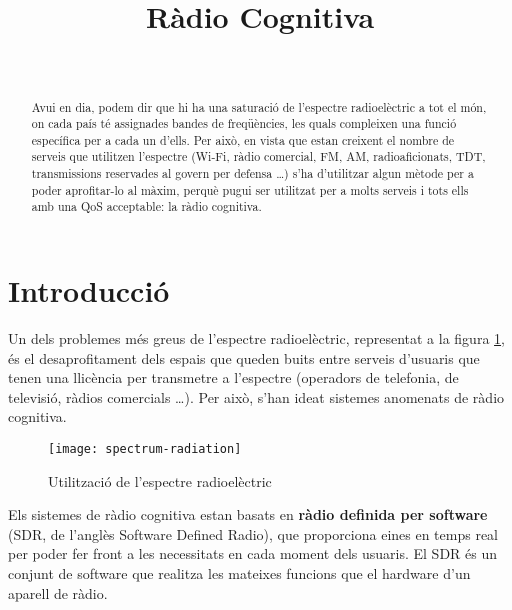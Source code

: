 \documentclass[10pt,journal,a4paper]{IEEEtran}
\begin{document}
\title{Ràdio Cognitiva}

\author{
\\
}

\maketitle

\begin{abstract}
Avui en dia, podem dir que hi ha una saturació de l’espectre radioelèctric a
tot el món, on cada país té assignades bandes de freqüències, les quals compleixen una funció específica per a cada un d’ells. Per això, en vista que estan creixent
el nombre de serveis que utilitzen l’espectre (Wi-Fi, ràdio comercial, FM,
AM, radioaficionats, TDT, transmissions reservades al govern per defensa \ldots )
s’ha d’utilitzar algun mètode per a poder aprofitar-lo al màxim, perquè pugui ser
utilitzat per a molts serveis i tots ells amb una QoS acceptable: la ràdio cognitiva.
\end{abstract}

%
%

\section{Introducció}
Un dels problemes més greus de l'espectre radioelèctric, representat a la figura \ref{logotipo}, és el desaprofitament dels espais que queden buits entre serveis d'usuaris que tenen una llicència per transmetre a l'espectre (operadors de telefonia, de televisió, ràdios comercials \ldots). Per això, s'han ideat sistemes anomenats de ràdio cognitiva. 
\begin{figure}[tpbh]
\centering
\texttt{[image: spectrum-radiation]}
\caption{Utilització de l'espectre radioelèctric} %
\label{logotipo}
\end{figure}
Els sistemes de ràdio cognitiva estan basats en \textbf{ràdio definida per software} (SDR, de l'anglès Software Defined Radio), que proporciona eines en temps real per poder fer front a les necessitats en cada moment dels usuaris.
El SDR és un conjunt de software que realitza les mateixes funcions que el hardware d'un aparell de ràdio.
\end{document}
